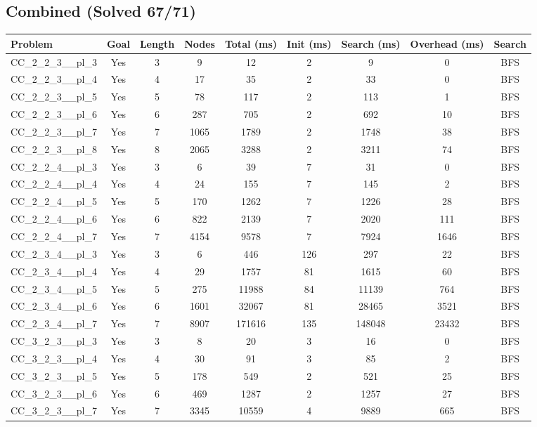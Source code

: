 \documentclass{article}
\begin{document}
\subsection*{Combined (Solved 67/71)}
\begin{tabular}{lcccccccc}
\toprule
Problem & Goal & Length & Nodes & Total (ms) & Init (ms) & Search (ms) & Overhead (ms) & Search \\
\midrule
CC\_2\_2\_3\_\_pl\_3 & Yes & 3 & 9 & 12 & 2 & 9 & 0 & BFS \\
CC\_2\_2\_3\_\_pl\_4 & Yes & 4 & 17 & 35 & 2 & 33 & 0 & BFS \\
CC\_2\_2\_3\_\_pl\_5 & Yes & 5 & 78 & 117 & 2 & 113 & 1 & BFS \\
CC\_2\_2\_3\_\_pl\_6 & Yes & 6 & 287 & 705 & 2 & 692 & 10 & BFS \\
CC\_2\_2\_3\_\_pl\_7 & Yes & 7 & 1065 & 1789 & 2 & 1748 & 38 & BFS \\
CC\_2\_2\_3\_\_pl\_8 & Yes & 8 & 2065 & 3288 & 2 & 3211 & 74 & BFS \\
CC\_2\_2\_4\_\_pl\_3 & Yes & 3 & 6 & 39 & 7 & 31 & 0 & BFS \\
CC\_2\_2\_4\_\_pl\_4 & Yes & 4 & 24 & 155 & 7 & 145 & 2 & BFS \\
CC\_2\_2\_4\_\_pl\_5 & Yes & 5 & 170 & 1262 & 7 & 1226 & 28 & BFS \\
CC\_2\_2\_4\_\_pl\_6 & Yes & 6 & 822 & 2139 & 7 & 2020 & 111 & BFS \\
CC\_2\_2\_4\_\_pl\_7 & Yes & 7 & 4154 & 9578 & 7 & 7924 & 1646 & BFS \\
CC\_2\_3\_4\_\_pl\_3 & Yes & 3 & 6 & 446 & 126 & 297 & 22 & BFS \\
CC\_2\_3\_4\_\_pl\_4 & Yes & 4 & 29 & 1757 & 81 & 1615 & 60 & BFS \\
CC\_2\_3\_4\_\_pl\_5 & Yes & 5 & 275 & 11988 & 84 & 11139 & 764 & BFS \\
CC\_2\_3\_4\_\_pl\_6 & Yes & 6 & 1601 & 32067 & 81 & 28465 & 3521 & BFS \\
CC\_2\_3\_4\_\_pl\_7 & Yes & 7 & 8907 & 171616 & 135 & 148048 & 23432 & BFS \\
CC\_3\_2\_3\_\_pl\_3 & Yes & 3 & 8 & 20 & 3 & 16 & 0 & BFS \\
CC\_3\_2\_3\_\_pl\_4 & Yes & 4 & 30 & 91 & 3 & 85 & 2 & BFS \\
CC\_3\_2\_3\_\_pl\_5 & Yes & 5 & 178 & 549 & 2 & 521 & 25 & BFS \\
CC\_3\_2\_3\_\_pl\_6 & Yes & 6 & 469 & 1287 & 2 & 1257 & 27 & BFS \\
CC\_3\_2\_3\_\_pl\_7 & Yes & 7 & 3345 & 10559 & 4 & 9889 & 665 & BFS \\

\end{tabular}
\end{document}
